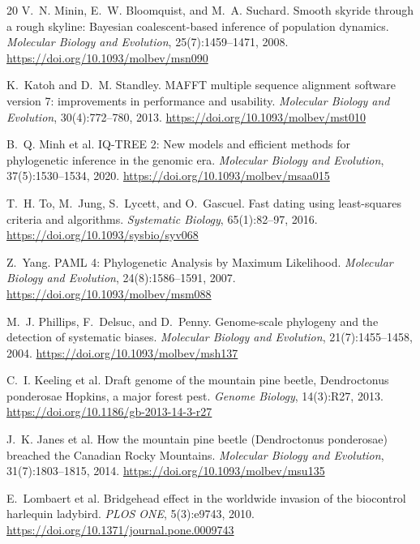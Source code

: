 \documentclass[10pt,letterpaper]{article}
\begin{document}
\begin{thebibliography}{20}
V.~N. Minin, E.~W. Bloomquist, and M.~A. Suchard.
\newblock Smooth skyride through a rough skyline: Bayesian coalescent-based inference of population dynamics.
\newblock \emph{Molecular Biology and Evolution}, 25(7):1459--1471, 2008. \url{https://doi.org/10.1093/molbev/msn090}

K.~Katoh and D.~M. Standley.
\newblock MAFFT multiple sequence alignment software version 7: improvements in performance and usability.
\newblock \emph{Molecular Biology and Evolution}, 30(4):772--780, 2013. \url{https://doi.org/10.1093/molbev/mst010}

B.~Q. Minh et al.
\newblock IQ-TREE 2: New models and efficient methods for phylogenetic inference in the genomic era.
\newblock \emph{Molecular Biology and Evolution}, 37(5):1530--1534, 2020. \url{https://doi.org/10.1093/molbev/msaa015}

T.~H. To, M.~Jung, S.~Lycett, and O.~Gascuel.
\newblock Fast dating using least-squares criteria and algorithms.
\newblock \emph{Systematic Biology}, 65(1):82--97, 2016. \url{https://doi.org/10.1093/sysbio/syv068}

Z.~Yang.
\newblock PAML 4: Phylogenetic Analysis by Maximum Likelihood.
\newblock \emph{Molecular Biology and Evolution}, 24(8):1586--1591, 2007. \url{https://doi.org/10.1093/molbev/msm088}

M.~J. Phillips, F.~Delsuc, and D.~Penny.
\newblock Genome-scale phylogeny and the detection of systematic biases.
\newblock \emph{Molecular Biology and Evolution}, 21(7):1455--1458, 2004. \url{https://doi.org/10.1093/molbev/msh137}

C.~I. Keeling et al.
\newblock Draft genome of the mountain pine beetle, Dendroctonus ponderosae Hopkins, a major forest pest.
\newblock \emph{Genome Biology}, 14(3):R27, 2013. \url{https://doi.org/10.1186/gb-2013-14-3-r27}

J.~K. Janes et al.
\newblock How the mountain pine beetle (Dendroctonus ponderosae) breached the Canadian Rocky Mountains.
\newblock \emph{Molecular Biology and Evolution}, 31(7):1803--1815, 2014. \url{https://doi.org/10.1093/molbev/msu135}

E.~Lombaert et al.
\newblock Bridgehead effect in the worldwide invasion of the biocontrol harlequin ladybird.
\newblock \emph{PLOS ONE}, 5(3):e9743, 2010. \url{https://doi.org/10.1371/journal.pone.0009743}


\end{thebibliography}
\end{document}
